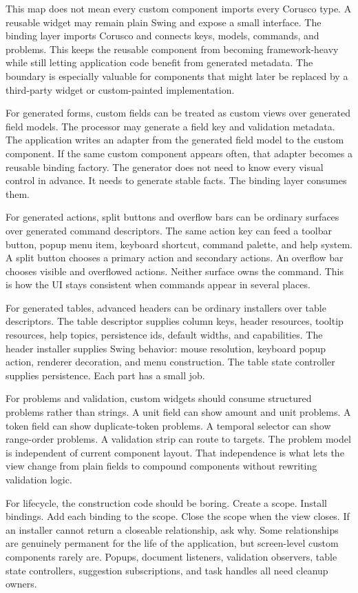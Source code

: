 This map does not mean every custom component imports every Corusco type. A
reusable widget may remain plain Swing and expose a small interface. The
binding layer imports Corusco and connects keys, models, commands, and
problems. This keeps the reusable component from becoming framework-heavy
while still letting application code benefit from generated metadata. The
boundary is especially valuable for components that might later be replaced
by a third-party widget or custom-painted implementation.

For generated forms, custom fields can be treated as custom views over
generated field models. The processor may generate a field key and validation
metadata. The application writes an adapter from the generated field model to
the custom component. If the same custom component appears often, that adapter
becomes a reusable binding factory. The generator does not need to know every
visual control in advance. It needs to generate stable facts. The binding
layer consumes them.

For generated actions, split buttons and overflow bars can be ordinary
surfaces over generated command descriptors. The same action key can feed a
toolbar button, popup menu item, keyboard shortcut, command palette, and help
system. A split button chooses a primary action and secondary actions. An
overflow bar chooses visible and overflowed actions. Neither surface owns the
command. This is how the UI stays consistent when commands appear in several
places.

For generated tables, advanced headers can be ordinary installers over table
descriptors. The table descriptor supplies column keys, header resources,
tooltip resources, help topics, persistence ids, default widths, and
capabilities. The header installer supplies Swing behavior: mouse resolution,
keyboard popup action, renderer decoration, and menu construction. The table
state controller supplies persistence. Each part has a small job.

For problems and validation, custom widgets should consume structured
problems rather than strings. A unit field can show amount and unit problems.
A token field can show duplicate-token problems. A temporal selector can show
range-order problems. A validation strip can route to targets. The problem
model is independent of current component layout. That independence is what
lets the view change from plain fields to compound components without
rewriting validation logic.

For lifecycle, the construction code should be boring. Create a scope. Install
bindings. Add each binding to the scope. Close the scope when the view closes.
If an installer cannot return a closeable relationship, ask why. Some
relationships are genuinely permanent for the life of the application, but
screen-level custom components rarely are. Popups, document listeners,
validation observers, table state controllers, suggestion subscriptions, and
task handles all need cleanup owners.

